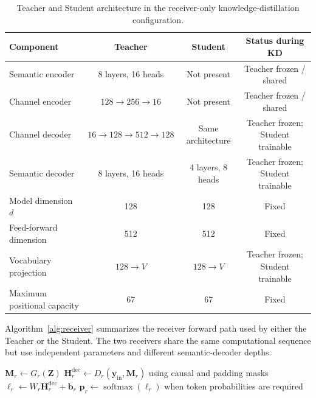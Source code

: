 \documentclass[conference]{IEEEtran}
\begin{document}
\begin{table}[t]
\centering
\caption{Teacher and Student architecture in the receiver-only knowledge-distillation configuration.}
\label{tab:teacher-student-architecture}
\small
\begin{tabular}{lccc}
\hline
\textbf{Component} & \textbf{Teacher} & \textbf{Student} & \textbf{Status during KD} \\
\hline
Semantic encoder & 8 layers, 16 heads & Not present & Teacher frozen / shared \\
Channel encoder & $128\!\rightarrow\!256\!\rightarrow\!16$ & Not present & Teacher frozen / shared \\
Channel decoder & $16\!\rightarrow\!128\!\rightarrow\!512\!\rightarrow\!128$ & Same architecture & Teacher frozen; Student trainable \\
Semantic decoder & 8 layers, 16 heads & 4 layers, 8 heads & Teacher frozen; Student trainable \\
Model dimension $d$ & 128 & 128 & Fixed \\
Feed-forward dimension & 512 & 512 & Fixed \\
Vocabulary projection & $128\!\rightarrow\!V$ & $128\!\rightarrow\!V$ & Teacher frozen; Student trainable \\
Maximum positional capacity & 67 & 67 & Fixed \\
\hline
\end{tabular}
\end{table}

Algorithm~\ref{alg:receiver} summarizes the receiver forward path used by either the Teacher or the Student. The two receivers share the same computational sequence but use independent parameters and different semantic-decoder depths.

\begin{algorithm}[t]
\caption{Semantic Receiver Forward Processing}
\label{alg:receiver}
\small
{}
$\mathbf{M}_r\leftarrow G_r(\mathbf{Z})$\;
$\mathbf{H}^{\mathrm{dec}}_r\leftarrow D_r(\mathbf{y}_{\mathrm{in}},\mathbf{M}_r)$ using causal and padding masks\;
$\boldsymbol{\ell}_r\leftarrow W_r\mathbf{H}^{\mathrm{dec}}_r+\mathbf{b}_r$\;
$\mathbf{p}_r\leftarrow\operatorname{softmax}(\boldsymbol{\ell}_r)$ when token probabilities are required\;
\;
\end{algorithm}
\end{document}
